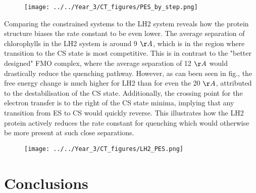 \begin{figure}
    \centering
    \texttt{[image: ../../Year\_3/CT\_figures/PES\_by\_step.png]}
\end{figure}

Comparing the constrained systems to the LH2 system reveals how the protein structure
biases the rate constant to be even lower. The average separation of chlorophylls
in the LH2 system is around 9 $\AA{}$, which is in the region where transition to
the CS state is most competitive. This is in contrast to the "better designed" FMO
complex, where the average separation of 12 $\AA{}$ would drastically reduce the
quenching pathway. However, as can been seen in fig., the free energy change is
much higher for LH2 than for even the 20 $\AA{}$, attributed to the destabilisation
of the CS state. Additionally, the crossing point for the electron transfer is to the
right of the CS state minima, implying that any transition from ES to CS would 
quickly reverse. This illustrates how the LH2 protein actively reduces the rate
constant for quenching which would otherwise be more present at such close separations.

\begin{figure}
    \centering
    \texttt{[image: ../../Year\_3/CT\_figures/LH2\_PES.png]}
\end{figure}



\section{Conclusions}

